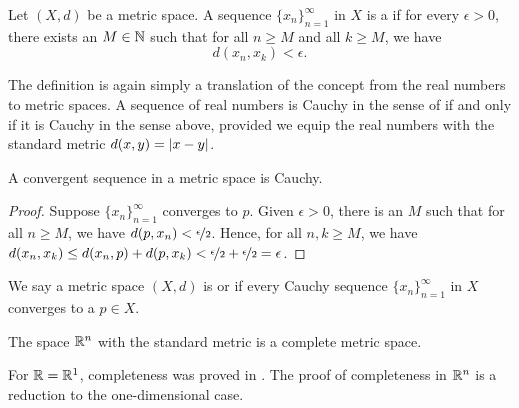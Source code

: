 \begin{defn}
Let $(X,d)$ be a metric space.
A sequence $\{ x_n \}_{n=1}^\infty$ in $X$ is a \emph{} if
for every $\epsilon > 0$, there exists an $M \in {\mathbb{N}}$ such that
for all $n \geq M$ and all $k \geq M$, we have
\begin{equation*}
d(x_n, x_k) < \epsilon .
\end{equation*}
\end{defn}

The definition is again simply a translation of the concept
from the real numbers to metric spaces.  A sequence of real
numbers is Cauchy in the sense of  if and only if
it is Cauchy in the sense above, provided we equip the real numbers with
the standard metric $d(x,y) = \lvert {x-y} \rvert$.

\begin{prop}
A convergent sequence in a metric space is Cauchy.
\end{prop}

\begin{proof}
Suppose $\{ x_n \}_{n=1}^\infty$ converges to $p$.
Given $\epsilon > 0$, there is an $M$ such that for all $n \geq M$,
we have $d(p,x_n) < \nicefrac{\epsilon}{2}$.  Hence,
for all $n,k \geq M$, we have
$d(x_n,x_k) \leq d(x_n,p) + d(p,x_k) < \nicefrac{\epsilon}{2} +
\nicefrac{\epsilon}{2} = \epsilon$.
\end{proof}

\begin{defn}
We say a metric space $(X,d)$ is
\emph{} or \emph{}
if every Cauchy sequence $\{ x_n \}_{n=1}^\infty$ in $X$
converges to a $p \in X$.
\end{defn}

\begin{prop}
The space ${\mathbb{R}}^n$ with the standard metric is a complete metric space.
\end{prop}

For ${\mathbb{R}} = {\mathbb{R}}^1$, completeness was proved in .
The proof of completeness in ${\mathbb{R}}^n$
is a reduction to the one-dimensional case.

